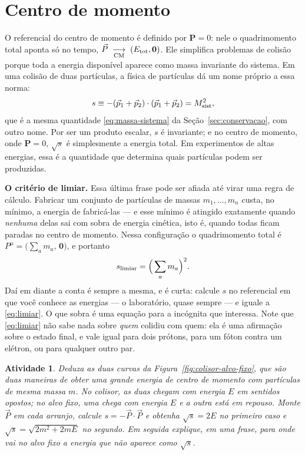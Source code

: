 \documentclass[12pt,a4paper,oneside]{book}
\theoremstyle{rgplain}
\newtheorem{activity}{Atividade}[chapter]
\theoremstyle{rgremark}
\newcommand{\temcomp}[1]{\;\underset{#1}{\longrightarrow}\;}
\begin{document}
\section{Centro de momento}
\label{sec:centro-momento}

O referencial do centro de momento é definido por $\bm P=0$: nele o
quadrimomento total aponta só no tempo,
$\vec P\temcomp{\mathrm{CM}}(E_{\rm tot},\bm 0)$. Ele simplifica problemas de
colisão porque toda a energia disponível aparece como massa invariante do
sistema. Em uma colisão de duas partículas, a física de partículas dá um nome
próprio a essa norma:
\begin{equation}
  s\equiv-(\vec p_1+\vec p_2)\cdot(\vec p_1+\vec p_2)=M_{\rm sist}^2 ,
  \label{eq:mandelstam-s}
\end{equation}
que é a mesma quantidade \eqref{eq:massa-sistema} da
Seção~\ref{sec:conservacao}, com outro nome. Por ser um produto escalar, $s$ é
invariante; e no centro de momento, onde $\bm P=0$, $\sqrt{s}$ é simplesmente
a energia total. Em
experimentos de altas energias, essa é a quantidade que determina quais
partículas podem ser produzidas.

\textbf{O critério de limiar.} Essa última frase pode ser afiada até virar uma
regra de cálculo. Fabricar um conjunto de partículas de massas
$m_1,\dots,m_n$ custa, no mínimo, a energia de fabricá-las --- e esse mínimo é
atingido exatamente quando \emph{nenhuma} delas sai com sobra de energia
cinética, isto é, quando todas ficam paradas no centro de momento. Nessa
configuração o quadrimomento total é $P^\mu=\bigl(\sum_a m_a,\,\bm 0\bigr)$, e
portanto
\begin{equation}
  s_{\rm limiar}=\Bigl(\,\sum_a m_a\Bigr)^{2}.
  \label{eq:limiar}
\end{equation}
Daí em diante a conta é sempre a mesma, e é curta: calcule $s$ no referencial
em que você conhece as energias --- o laboratório, quase sempre --- e iguale a
\eqref{eq:limiar}. O que sobra é uma equação para a incógnita que interessa.
Note que \eqref{eq:limiar} não sabe nada sobre \emph{quem} colidiu com quem:
ela é uma afirmação sobre o estado final, e vale igual para dois prótons, para
um fóton contra um elétron, ou para qualquer outro par.

\begin{activity}
Deduza as duas curvas da Figura~\ref{fig:colisor-alvo-fixo}, que são duas
maneiras de obter uma grande energia de centro de momento com partículas de
mesma massa $m$. No \emph{colisor}, as duas chegam com energia $E$ em sentidos
opostos; no \emph{alvo fixo}, uma chega com energia $E$ e a outra está em
repouso. Monte $\vec P$ em cada arranjo, calcule $s=-\vec P\cdot\vec P$ e
obtenha $\sqrt s=2E$ no primeiro caso e $\sqrt s=\sqrt{2m^2+2mE}$ no segundo.
Em seguida explique, em uma frase, para onde vai no alvo fixo a energia que
\emph{não} aparece como $\sqrt s$.
\end{activity}
\end{document}
